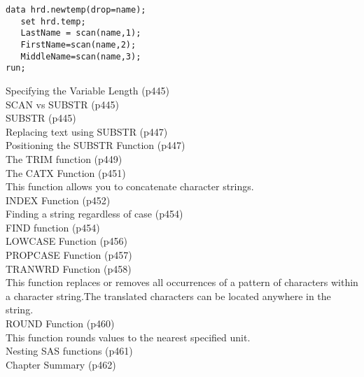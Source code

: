 \begin{framed}
\begin{verbatim}
data hrd.newtemp(drop=name);
   set hrd.temp;
   LastName = scan(name,1);
   FirstName=scan(name,2);
   MiddleName=scan(name,3);
run;
\end{verbatim}
\end{framed}

Specifying the Variable Length (p445)\\
SCAN vs SUBSTR (p445)\\
SUBSTR (p445)\\
Replacing text using SUBSTR (p447)\\
Positioning the SUBSTR Function (p447)\\
The TRIM function (p449)\\
The CATX Function (p451)\\
This function allows you to concatenate character strings.\\
INDEX Function (p452)\\
Finding a string regardless of case (p454)\\
FIND function (p454)\\
LOWCASE Function (p456)\\
PROPCASE Function (p457)\\
TRANWRD Function (p458)\\
This function replaces or removes all occurrences of a pattern of characters within a character string.The translated characters can be located anywhere in the string.\\
ROUND Function (p460)\\
This function rounds values to the nearest specified unit.\\
Nesting SAS functions (p461)\\
Chapter Summary (p462)\\



